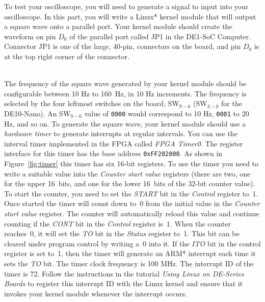 \documentclass[epsfig,10pt,fullpage]{article}
\begin{document}
\noindent
To test your oscilloscope, you will need to generate a signal to input into your oscilloscope. 
In this part, you will write a Linux* kernel module that will output a square wave onto a
parallel port. Your kernel module should create the waveform on pin $D_0$ of the parallel
port called JP1 in the DE1-SoC Computer. Connector JP1 is one of the large, 40-pin,
connectors on the board, and pin $D_0$ is at the top right corner of the connector.

~\\
\noindent
The frequency of the square wave generated by your kernel module should be configurable between
10 Hz to 160~Hz, in 10 Hz increments. The frequency is selected by the four leftmost switches on
the board, SW$_{9-6}$ (SW$_{3-0}$ for the DE10-Nano). An SW$_{9-6}$ value 
of \texttt{0000} would correspond to 10 Hz, \texttt{0001} to 20 Hz, and 
so on. To generate the square wave, your kernel module should use a {\it hardware timer}
to generate interrupts at regular intervals. You can use the interval timer implemented 
in the FPGA called {\it FPGA Timer0}. The register interface for this timer has the base 
address \texttt{0xFF202000}. As shown in Figure~\ref{fig:timer} this timer has six 16-bit 
registers. To use the timer you need to write a suitable value into the {\it Counter start value}
registers (there are two, one for the upper 16~bits, and one for the lower 16~bits of the 
32-bit counter value). To start the counter, you need to set the {\it START} bit in the 
{\it Control} register to~1. Once started the timer will count down to~0 from the initial 
value in the {\it Counter start value} register.  The counter will automatically reload this 
value and continue counting if the {\it CONT} bit in the {\it Control} register is~1. When the 
counter reaches~0, it will set the {\it TO} bit in the {\it Status} register to~1.
This bit can be cleared under program control by writing a~0 into it. If the 
{\it ITO} bit in the control register is set to~1, then the timer will generate an ARM* 
interrupt each time it sets the {\it TO} bit. The timer clock frequency is 100 MHz. 
The interrupt ID of the timer is 72. Follow the instructions in the tutorial {\it Using Linux 
on DE-Series Boards} to register this interrupt ID with the Linux kernel and ensure that it invokes 
your kernel module whenever the interrupt occurs.
\end{document}
